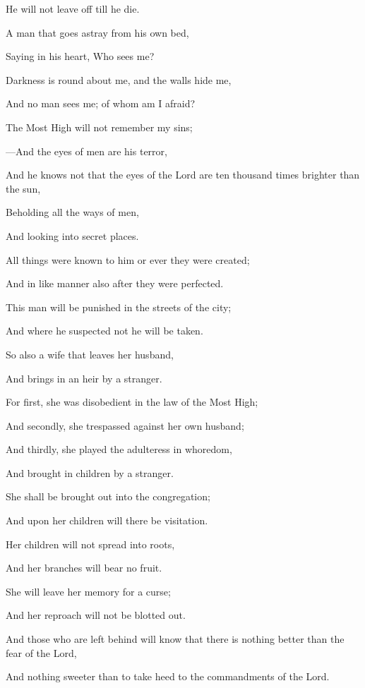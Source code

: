 {\par }{\Q He will not leave off till he die.
\par }{\Q {}A man that goes astray from his own bed,
\par }{\Q Saying in his heart, Who sees me?
\par }{\Q Darkness is round about me, and the walls hide me,
\par }{\Q And no man sees me; of whom am I afraid?
\par }{\Q The Most High will not remember my sins;
\par }{\Q {}—And the eyes of men are his terror,
\par }{\Q And he knows not that the eyes of the Lord are ten thousand times brighter than the sun,
\par }{\Q Beholding all the ways of men,
\par }{\Q And looking into secret places.
\par }{\Q {}All things were known to him or ever they were created;
\par }{\Q And in like manner also after they were perfected.
\par }{\Q {}This man will be punished in the streets of the city;
\par }{\Q And where he suspected not he will be taken.
\par }{\Q {}So also a wife that leaves her husband,
\par }{\Q And brings in an heir by a stranger.
\par }{\Q {}For first, she was disobedient in the law of the Most High;
\par }{\Q And secondly, she trespassed against her own husband;
\par }{\Q And thirdly, she played the adulteress in whoredom,
\par }{\Q And brought in children by a stranger.
\par }{\Q {}She shall be brought out into the congregation;
\par }{\Q And upon her children will there be visitation.
\par }{\Q {}Her children will not spread into roots,
\par }{\Q And her branches will bear no fruit.
\par }{\Q {}She will leave her memory for a curse;
\par }{\Q And her reproach will not be blotted out.
\par }{\Q {}And those who are left behind will know that there is nothing better than the fear of the Lord,
\par }{\Q And nothing sweeter than to take heed to the commandments of the Lord.

}
